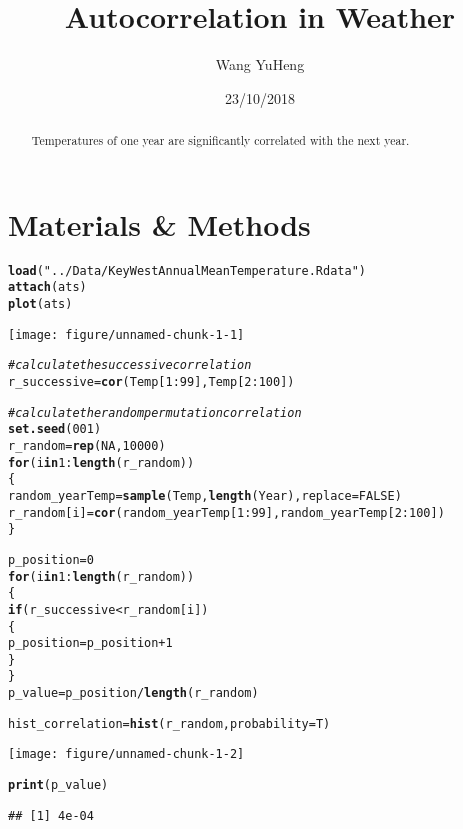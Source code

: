 \documentclass{article}\usepackage[]{graphicx}\usepackage[]{color}
\title{Autocorrelation in Weather}
\author{Wang YuHeng}
\date{23/10/2018}
\makeatletter
\def\maxwidth{ %
  \ifdim\Gin@nat@width>\linewidth
    \linewidth
  \else
    \Gin@nat@width
  \fi
}
\newcommand{\hlnum}[1]{\textcolor[rgb]{0.686,0.059,0.569}{#1}}%
\newcommand{\hlstr}[1]{\textcolor[rgb]{0.192,0.494,0.8}{#1}}%
\newcommand{\hlcom}[1]{\textcolor[rgb]{0.678,0.584,0.686}{\textit{#1}}}%
\newcommand{\hlopt}[1]{\textcolor[rgb]{0,0,0}{#1}}%
\newcommand{\hlstd}[1]{\textcolor[rgb]{0.345,0.345,0.345}{#1}}%
\newcommand{\hlkwa}[1]{\textcolor[rgb]{0.161,0.373,0.58}{\textbf{#1}}}%
\newcommand{\hlkwb}[1]{\textcolor[rgb]{0.69,0.353,0.396}{#1}}%
\newcommand{\hlkwc}[1]{\textcolor[rgb]{0.333,0.667,0.333}{#1}}%
\newcommand{\hlkwd}[1]{\textcolor[rgb]{0.737,0.353,0.396}{\textbf{#1}}}%
\newenvironment{kframe}{%
 \def\at@end@of@kframe{}%
 \ifinner\ifhmode%
  \def\at@end@of@kframe{\end{minipage}}%
  \begin{minipage}{\columnwidth}%
 \fi\fi%
 \def\FrameCommand##1{\hskip\@totalleftmargin \hskip-\fboxsep
 \colorbox{shadecolor}{##1}\hskip-\fboxsep
     \hskip-\linewidth \hskip-\@totalleftmargin \hskip\columnwidth}%
 \MakeFramed {\advance\hsize-\width
   \@totalleftmargin\z@ \linewidth\hsize
   \@setminipage}}%
 {\par\unskip\endMakeFramed%
 \at@end@of@kframe}
\newenvironment{knitrout}{}{} %
\makeatother
\begin{document}
  \maketitle
  
  \begin{abstract}
    Temperatures of one year are significantly correlated with the next year. 
  \end{abstract}

  \section{Materials \& Methods}
\begin{knitrout}
\color{fgcolor}\begin{kframe}
\begin{alltt}
\hlkwd{load}\hlstd{(}\hlstr{"../Data/KeyWestAnnualMeanTemperature.Rdata"}\hlstd{)}
\hlkwd{attach}\hlstd{(ats)}
\hlkwd{plot}\hlstd{(ats)}
\end{alltt}
\end{kframe}
\texttt{[image: figure/unnamed-chunk-1-1]} 
\begin{kframe}\begin{alltt}
\hlcom{#calculate the successive correlation}
\hlstd{r_successive} \hlkwb{=} \hlkwd{cor}\hlstd{(Temp[}\hlnum{1}\hlopt{:}\hlnum{99}\hlstd{],Temp[}\hlnum{2}\hlopt{:}\hlnum{100}\hlstd{])}

\hlcom{# calculate the random permutation correlation}
\hlkwd{set.seed}\hlstd{(}\hlnum{001}\hlstd{)}
\hlstd{r_random} \hlkwb{=} \hlkwd{rep}\hlstd{(}\hlnum{NA}\hlstd{,} \hlnum{10000}\hlstd{)}
\hlkwa{for} \hlstd{(i} \hlkwa{in} \hlnum{1}\hlopt{:}\hlkwd{length}\hlstd{(r_random))}
\hlstd{\{}
  \hlstd{random_yearTemp} \hlkwb{=} \hlkwd{sample}\hlstd{(Temp,} \hlkwd{length}\hlstd{(Year),} \hlkwc{replace} \hlstd{=} \hlnum{FALSE}\hlstd{)}
  \hlstd{r_random[i]} \hlkwb{=} \hlkwd{cor}\hlstd{(random_yearTemp[}\hlnum{1}\hlopt{:}\hlnum{99}\hlstd{],random_yearTemp[}\hlnum{2}\hlopt{:}\hlnum{100}\hlstd{])}
\hlstd{\}}

\hlstd{p_position}\hlkwb{=}\hlnum{0}
\hlkwa{for} \hlstd{(i} \hlkwa{in} \hlnum{1}\hlopt{:}\hlkwd{length}\hlstd{(r_random))}
\hlstd{\{}
  \hlkwa{if} \hlstd{(r_successive}\hlopt{<}\hlstd{r_random[i])}
  \hlstd{\{}
    \hlstd{p_position} \hlkwb{=} \hlstd{p_position}\hlopt{+}\hlnum{1}
  \hlstd{\}}
\hlstd{\}}
\hlstd{p_value} \hlkwb{=} \hlstd{p_position}\hlopt{/}\hlkwd{length}\hlstd{(r_random)}

\hlstd{hist_correlation}\hlkwb{=}\hlkwd{hist}\hlstd{(r_random,} \hlkwc{probability} \hlstd{= T)}
\end{alltt}
\end{kframe}
\texttt{[image: figure/unnamed-chunk-1-2]} 
\begin{kframe}\begin{alltt}
\hlkwd{print} \hlstd{(p_value)}
\end{alltt}
\begin{verbatim}
## [1] 4e-04
\end{verbatim}
\end{kframe}
\end{knitrout}
\end{document}
